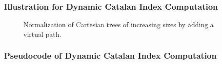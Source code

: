 \begin{frame}
	\frametitle{Illustration for Dynamic Catalan Index Computation}
	\begin{center}
		\scalebox{0.8} { \begin{minipage}{1.3\textwidth}
			\begin{figure}[!thb]
			  \centering {}  
			  \caption{Normalization of Cartesian trees of increasing sizes by
			    adding a virtual path.}
			  \label{fig:cartesianEncoding}
			\end{figure}
			\end{minipage}
		}
	\end{center}
\end{frame}

\begin{frame}
	\frametitle{Pseudocode of Dynamic Catalan Index Computation}
	\begin{center}
		\scalebox{0.7} { \begin{minipage}{\textwidth}
			
			\end{minipage}
		}
	\end{center}
\end{frame}